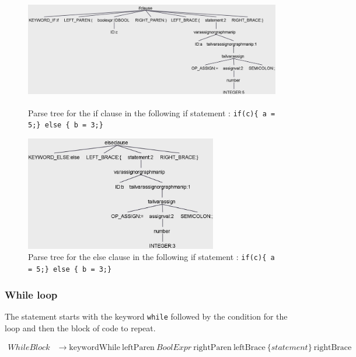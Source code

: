 \begin{figure}[H]
    \centering
    \includegraphics[height = 5cm]{figures/parse_trees/parseTree_ifClause}
    \caption{Parse tree for the if clause in the following if statement : \texttt{if(c)\{
    a = 5;\}
    else \{
    b = 3;\}}}
    \label{fig:parseTree_ifClause}
\end{figure}

\begin{figure}[H]
    \centering
    \includegraphics[height = 5cm]{figures/parse_trees/parseTree_elseClause}
    \caption{Parse tree for the else clause in the following if statement : \texttt{if(c)\{
    a = 5;\}
    else \{
    b = 3;\}}}
    \label{fig:parseTree_elseClause}
\end{figure}

\subsubsection*{While loop}

The statement starts with the keyword \texttt{while} followed by the condition for the loop and then the block of code to repeat.

\begin{align*}
\mathit{WhileBlock} &\rightarrow \text{keywordWhile} \: \text{leftParen} \: \mathit{BoolExpr} \: \text{rightParen} \: \text{leftBrace} \: \{ \mathit{statement}\} \: \text{rightBrace}
\end{align*}

